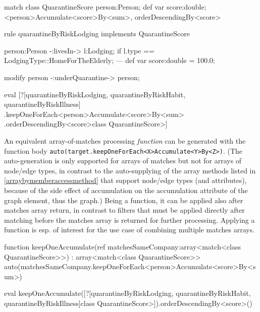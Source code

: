 \begin{example}
  \begin{grgen}
match class QuarantineScore
{
	person:Person;
	def var score:double;
} \keepOneForEach<person>Accumulate<score>By<sum>, orderDescendingBy<score>

rule quarantineByRiskLodging implements QuarantineScore
{
	person:Person -:livesIn-> l:Lodging;
	if { l.type == LodgingType::HomeForTheElderly; }
---
	def var score:double = 100.0;
	
	modify {
		person -:underQuarantine-> person;
	}
}
  \end{grgen}\label{exkeeponeforeachaccumulatebyfilter}

	\begin{grshell}
	eval [?[quarantineByRiskLodging, quarantineByRiskHabit, quarantineByRiskIllness]
		\QuarantineScore.keepOneForEach<person>Accumulate<score>By<sum>
		\QuarantineScore.orderDescendingBy<score>\<class QuarantineScore>]
	\end{grshell}
\end{example}

An equivalent array-of-matches processing \emph{function} can be generated with the function body \texttt{auto(target.keepOneForEach<X>Accumulate<Y>By<Z>)}.
(The auto-generation is only supported for arrays of matches but not for arrays of node/edge types, in contrast to the auto-supplying of the array methods listed in \ref{arraybymemberaccessmethod} that support node/edge types (and attributes), because of the side effect of accumulation on the accumulation attribute of the graph element, thus the graph.)
Being a function, it can be applied also after matches array return, in contrast to filters that must be applied directly after matching before the matches array is returned for further processing.
Applying a function is esp. of interest for the use case of combining multiple matches arrays.

\begin{example}
  \begin{grgen}
function keepOneAccumulate(ref matchesSameCompany:array<match<class QuarantineScore>>) : array<match<class QuarantineScore>>
{
	auto(matchesSameCompany.keepOneForEach<person>Accumulate<score>By<sum>)
}
  \end{grgen}\label{exkeeponeforeachaccumulateby}

	\begin{grshell}
	eval keepOneAccumulate([?[quarantineByRiskLodging, quarantineByRiskHabit, quarantineByRiskIllness]\<class QuarantineScore>]).orderDescendingBy<score>()
	\end{grshell}
\end{example}


